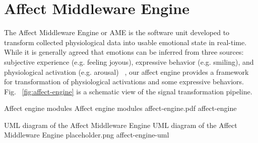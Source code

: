 
\section{Affect Middleware Engine}

The Affect Middleware Engine or AME is the software unit developed to transform collected physiological data into usable emotional state in real-time. While it is generally agreed that emotions can be inferred from three sources: subjective experience (e.g. feeling joyous), expressive behavior (e.g. smiling), and physiological activation (e.g. arousal) ~\cite{scherer1993neuroscience}, our affect engine provides a framework for transformation of physiological activations and some expressive behaviors. Fig. ~\ref{fig:affect-engine} is a schematic view of the signal transformation pipeline.

\img
{Affect engine modules}
{Affect engine modules}
{affect-engine.pdf}
{affect-engine}

\largeimg
{UML diagram of the Affect Middleware Engine}
{UML diagram of the Affect Middleware Engine}
{placeholder.png}
{affect-engine-uml}

